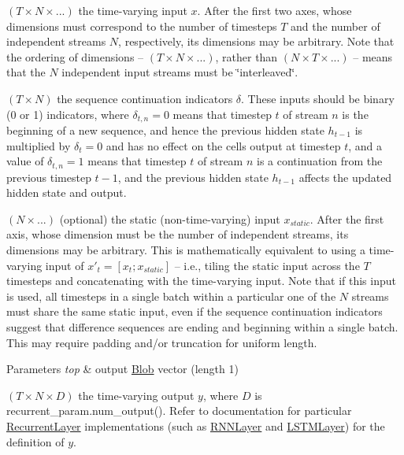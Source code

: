 \begin{DoxyEnumerate}
\item $ (T \times N \times ...) $ the time-\/varying input $ x $. After the first two axes, whose dimensions must correspond to the number of timesteps $ T $ and the number of independent streams $ N $, respectively, its dimensions may be arbitrary. Note that the ordering of dimensions -- $ (T \times N \times ...) $, rather than $ (N \times T \times ...) $ -- means that the $ N $ independent input streams must be \char`\"{}interleaved\char`\"{}.
\item $ (T \times N) $ the sequence continuation indicators $ \delta $. These inputs should be binary (0 or 1) indicators, where $ \delta_{t,n} = 0 $ means that timestep $ t $ of stream $ n $ is the beginning of a new sequence, and hence the previous hidden state $ h_{t-1} $ is multiplied by $ \delta_t = 0 $ and has no effect on the cell\textquotesingle{}s output at timestep $ t $, and a value of $ \delta_{t,n} = 1 $ means that timestep $ t $ of stream $ n $ is a continuation from the previous timestep $ t-1 $, and the previous hidden state $ h_{t-1} $ affects the updated hidden state and output.
\item $ (N \times ...) $ (optional) the static (non-\/time-\/varying) input $ x_{static} $. After the first axis, whose dimension must be the number of independent streams, its dimensions may be arbitrary. This is mathematically equivalent to using a time-\/varying input of $ x'_t = [x_t; x_{static}] $ -- i.\+e., tiling the static input across the $ T $ timesteps and concatenating with the time-\/varying input. Note that if this input is used, all timesteps in a single batch within a particular one of the $ N $ streams must share the same static input, even if the sequence continuation indicators suggest that difference sequences are ending and beginning within a single batch. This may require padding and/or truncation for uniform length.
\end{DoxyEnumerate}


\begin{DoxyParams}{Parameters}
{\em top} & output \hyperlink{classcaffe_1_1Blob}{Blob} vector (length 1)
\begin{DoxyEnumerate}
\item $ (T \times N \times D) $ the time-\/varying output $ y $, where $ D $ is {\ttfamily recurrent\+\_\+param.\+num\+\_\+output()}. Refer to documentation for particular \hyperlink{classcaffe_1_1RecurrentLayer}{Recurrent\+Layer} implementations (such as \hyperlink{classcaffe_1_1RNNLayer}{R\+N\+N\+Layer} and \hyperlink{classcaffe_1_1LSTMLayer}{L\+S\+T\+M\+Layer}) for the definition of $ y $. 
\end{DoxyEnumerate}\\
\hline
\end{DoxyParams}


